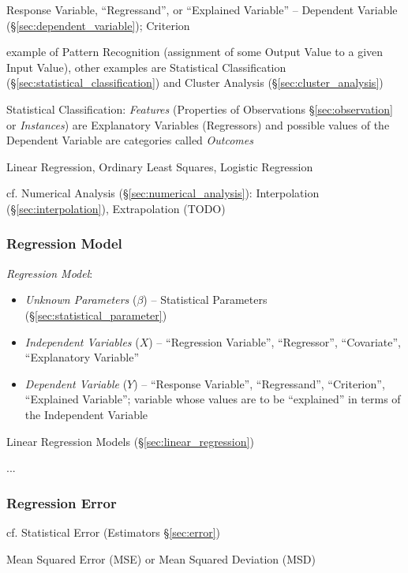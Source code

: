 Response Variable, ``Regressand'', or ``Explained Variable'' -- Dependent
Variable (\S\ref{sec:dependent_variable}); Criterion

example of Pattern Recognition (assignment of some Output Value to a given Input
Value), other examples are Statistical Classification
(\S\ref{sec:statistical_classification}) and Cluster Analysis
(\S\ref{sec:cluster_analysis})

Statistical Classification: \emph{Features} (Properties of Observations
\S\ref{sec:observation} or \emph{Instances}) are Explanatory Variables
(Regressors) and possible values of the Dependent Variable are categories called
\emph{Outcomes}

Linear Regression, Ordinary Least Squares, Logistic Regression

cf. Numerical Analysis (\S\ref{sec:numerical_analysis}): Interpolation
(\S\ref{sec:interpolation}), Extrapolation (TODO)



\subsubsection{Regression Model}\label{sec:regression_model}

\emph{Regression Model}:
\begin{itemize}
  \item \emph{Unknown Parameters} ($\beta$) -- Statistical Parameters
    (\S\ref{sec:statistical_parameter})
  \item \emph{Independent Variables} ($X$) -- ``Regression Variable'',
    ``Regressor'', ``Covariate'', ``Explanatory Variable''
  \item \emph{Dependent Variable} ($Y$) -- ``Response Variable'',
    ``Regressand'', ``Criterion'', ``Explained Variable''; variable whose values
    are to be ``explained'' in terms of the Independent Variable
\end{itemize}

Linear Regression Models (\S\ref{sec:linear_regression})

...



\subsubsection{Regression Error}\label{sec:regression_error}

\fist cf. Statistical Error (Estimators \S\ref{sec:error})

Mean Squared Error (MSE) or Mean Squared Deviation (MSD)



